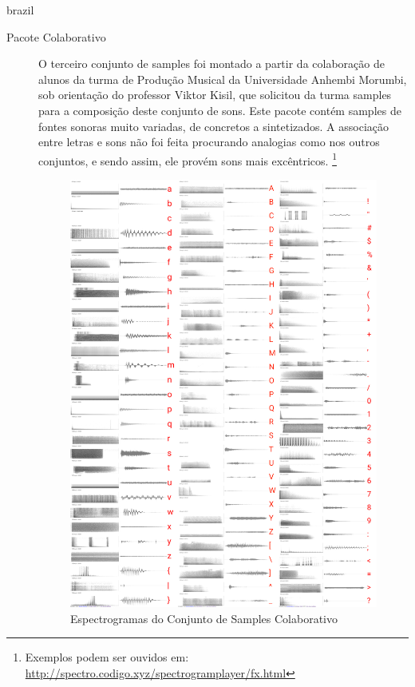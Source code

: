 \begin{otherlanguage*}{brazil}
\begin{description}
\item[Pacote Colaborativo]O terceiro conjunto de samples foi montado a partir da colaboração de alunos da turma de Produção Musical da Universidade Anhembi Morumbi, sob orientação do professor Viktor Kisil, que solicitou da turma samples para a composição deste conjunto de sons. Este pacote contém samples de fontes sonoras muito variadas, de concretos a sintetizados. A associação entre letras e sons não foi feita procurando analogias como nos outros conjuntos, e sendo assim, ele provém sons mais excêntricos. \footnote{Exemplos podem ser ouvidos em: \url{http://spectro.codigo.xyz/spectrogramplayer/fx.html}} 

\begin{figure}[htb]
    \caption{\label{samplescolab}Espectrogramas do Conjunto de Samples Colaborativo}
    \begin{center}
        \includegraphics[width=0.7\linewidth]{pictures/cap3/bandaabertacolab.jpg}
    \end{center}
\end{figure}


\end{description}
\end{otherlanguage*}
